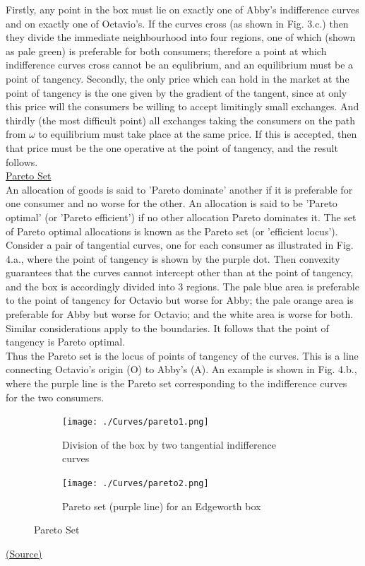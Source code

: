 \documentclass[a4paper, 12pt, reqno]{article}
\begin{document}
Firstly, any point in the box must lie on exactly one of Abby's indifference curves and on exactly one of Octavio's. If the curves cross (as shown in Fig. 3.c.) then they divide the immediate neighbourhood into four regions, 
one of which (shown as pale green) is preferable for both consumers; therefore a point at which indifference curves cross cannot be an equlibrium, and an equilibrium must be a point of tangency.
Secondly, the only price which can hold in the market at the point of tangency is the one given by the gradient of the tangent, since at only this price will the consumers be willing to accept limitingly small exchanges.
And thirdly (the most difficult point) all exchanges taking the consumers on the path from $\omega$ to equilibrium must take place at the same price. 
If this is accepted, then that price must be the one operative at the point of tangency, and the result follows. \\

\underline{Pareto Set} \\
An allocation of goods is said to 'Pareto dominate' another if it is preferable for one consumer and no worse for the other. An allocation is said to be 'Pareto optimal' (or 'Pareto efficient') if no other allocation Pareto dominates it. The set of Pareto optimal allocations is known as the Pareto 
set (or 'efficient locus'). \\
Consider a pair of tangential curves, one for each consumer as illustrated in Fig. 4.a., where the point of tangency is shown by the purple dot. Then convexity guarantees that the curves cannot intercept other than at the point of tangency, and the box is accordingly divided into 3 regions. The pale blue 
area is preferable to the point of tangency for Octavio but worse for Abby; the pale orange area is preferable for Abby but worse for Octavio; and the white area is worse for both. Similar 
considerations apply to the boundaries. It follows that the point of tangency is Pareto optimal. \\ 
Thus the Pareto set is the locus of points of tangency of the curves. This is a line connecting Octavio's origin (O) to Abby's (A). An example is shown in Fig. 4.b., where the purple line is the Pareto set corresponding to the indifference curves for the two consumers.
\begin{figure}[H]
    \centering
    \begin{subfigure}{0.4\textwidth}
        \texttt{[image: ./Curves/pareto1.png]}
        \caption{Division of the box by two tangential indifference curves}
        \label{fig:4a}
    \end{subfigure}
    \hfill
    \begin{subfigure}{0.4\textwidth}
        \texttt{[image: ./Curves/pareto2.png]}
        \caption{Pareto set (purple line) for an Edgeworth box}
        \label{fig:4b}
    \end{subfigure}
            
    \caption{Pareto Set}
    \label{fig:pareto curves}
\end{figure}

\href{https://en.wikipedia.org/wiki/Edgeworth_box}{(Source)}
\end{document}

